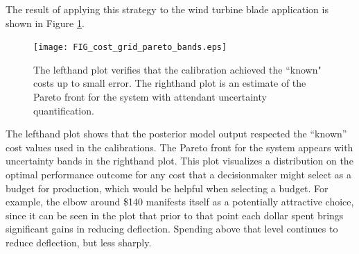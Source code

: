 \documentclass[12pt]{article}
\begin{document}
%
The result of applying this strategy to the wind turbine blade application is shown in Figure \ref{fig:known_cost}. 
%
\begin{figure}
\centering
\texttt{[image: FIG\_cost\_grid\_pareto\_bands.eps]}
\caption{The lefthand plot verifies that the calibration achieved the ``known" costs up to small error. The righthand plot is an estimate of the Pareto front for the system with attendant uncertainty quantification.}
\label{fig:known_cost}
\end{figure}
%
The lefthand plot shows that the posterior model output respected the ``known'' cost values used in the calibrations.
%
The Pareto front for the system appears with uncertainty bands in the righthand plot.
%
This plot visualizes a distribution on the optimal performance outcome for any cost that a decisionmaker might select as a budget for production, which would be helpful when selecting a budget.
%
For example, the elbow around \$140 manifests itself as a potentially attractive choice, since it can be seen in the plot that prior to that point each dollar spent brings significant gains in reducing deflection.
%
Spending above that level continues to reduce deflection, but less sharply.
\end{document}
